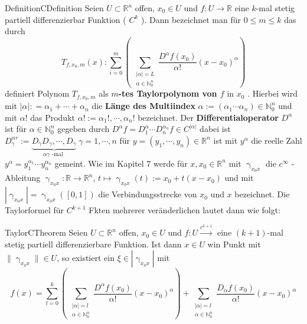 \begin{ibox}[]{Definition}{CDefinition}
    Seien $ U \subset \mathbb{R}^n  $ offen, $ x_0 \in U $ und $ f: U \to \mathbb{R}  $ eine $ k $-mal stetig partiell differenzierbar
	Funktion ( $ C^{k} $ ). Dann bezeichnet man für $ 0 \leq  m \leq k $ das durch
	$$ T_{f, x_0, m} \left(x\right) : \sum_{i=0}^{m} \left( \, \sum_{ \substack{ |\alpha| = L \\ \alpha \in \mathbb{N}_{0}^{n} }}
	\frac{D^{\alpha }f \left(x_0\right) }{\alpha !} \left( x - x_0 \right) ^{\alpha }\right) $$ 
		definiert Polynom $ T_{f,x_0,m} $ als \textbf{ $ m $-tes Taylorpolynom von $ f \text{ in } x_0 $ }. Hierbei wird mit 
	$ |\alpha| : = \alpha_1 +  \cdots + \alpha_n $ die \textbf{Länge des Multiindex} $ \alpha := \left( \alpha_1  \cdots  \alpha_{n} \right) \in \mathbb{N}_{0}^{n} $ und mit $ \alpha ! $ das Produkt $ \alpha ! := \alpha_1 ! , \cdots,  \alpha_{n} ! $ bezeichnet. Der 
	\textbf{Differentialoperator} $ D^{\alpha } $ ist für $ \alpha  \in \mathbb{N}_{0}^{n} $ gegeben durch $ D^{\alpha }f = 
	D_1^{\alpha } \cdots  D_n^{\alpha_n} f \in C^{|\alpha |}$ dabei ist $ D_{\gamma }^{\alpha r} := \underbrace{ D_{\gamma } 
	D_{\gamma }, \cdots,  D_{\gamma }}_{\alpha \gamma \text{ -mal } } \; \gamma = 1, \cdots,  n \text{ für } y = \left( y_1
, \cdots,  y_n\right) \in \mathbb{R}^n $	ist mit  $ y^{\alpha } $ die reelle Zahl $ y^{\alpha } = y_1^{\alpha_1}
\cdots  y_n^{\alpha_n} $  gemeint. Wie im Kapitel 7 werde für $ x,x_0 \in \mathbb{R}^n  $ mit $ \upgamma_{x_0x} $ die $ c^{ \infty } $
-Ableitung $ \upgamma_{x_0x}: \mathbb{R}  \to \mathbb{R}^n  $, $ t \mapsto \upgamma_{x_0x} \left(t\right) := x_0 + t(x-x_0)$ und mit
$  \left| \upgamma_{x_0x} \right| = \upgamma_{x_0x} \left( \left[ 0,1 \right]  \right)  $ die Verbindungsstrecke von $ x_0 \text{ und }
x $ bezeichnet. Die Taylorformel für $ C^{k+1} $ Fkten mehrerer veränderlichen lautet dann wie folgt:
\end{ibox}
\begin{ibox}[40]{Taylor}{CTheorem}
	Seien $ U \subset \mathbb{R}^n  $ offen, $ x_0 \in U $ und $ f:U \xrightarrow{c^{k+1}}$ eine $ (k+1) $-mal stetig 
	partiell differenzierbare Funktion. Ist dann $ x \in  U $ win Punkt mit $ \| \upgamma_{x_0x} \| \in U $, so existiert ein 
	$ \xi \in \left| \upgamma_{x_0x} \right|  $ mit 
	$$ f \left(x\right) = \sum_{l=0}^{k} \left( \, \sum_{ \substack{ |\alpha | = l \\ \alpha \in \mathbb{N}_{0}^{n} }} 
	\frac{D^{\alpha }f \left(x_0\right) }{\alpha !} \left( x - x_0 \right) ^{\alpha } \right) + \sum_{ \substack{ |\alpha | = l \\ 
\alpha  \in  \mathbb{N}_{0}^{n}}} \frac{D_{\alpha }f \left(x_0\right) }{\alpha !} \left( x-x_0 \right) ^{\alpha } $$
\end{ibox}
 
